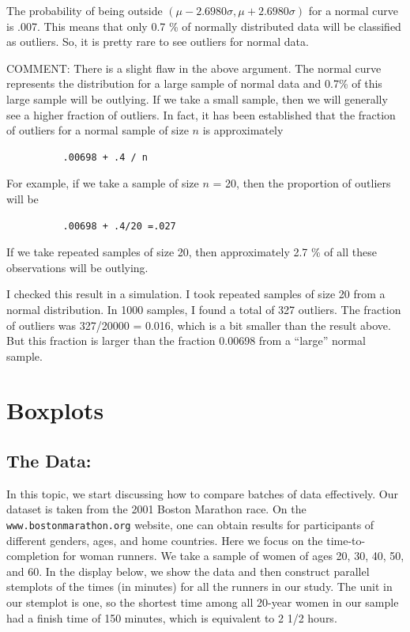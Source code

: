 \documentclass[
]{book}
\begin{document}
The probability of being outside \(( \mu - 2.6980\sigma , \mu + 2.6980 \sigma )\) for a normal curve is .007. This means that only 0.7 \% of normally distributed data will be classified as outliers. So, it is pretty rare to see outliers for normal data.

COMMENT: There is a slight flaw in the above argument. The normal curve represents the distribution for a large sample of normal data and 0.7\% of this large sample will be outlying. If we take a small sample, then we will generally see a higher fraction of outliers. In fact, it has been established that the fraction of outliers for a normal sample of size \(n\) is approximately

\begin{verbatim}
          .00698 + .4 / n
\end{verbatim}

For example, if we take a sample of size \(n\) = 20, then the proportion of outliers will be

\begin{verbatim}
          .00698 + .4/20 =.027
\end{verbatim}

If we take repeated samples of size 20, then approximately 2.7 \% of all these observations will be outlying.

I checked this result in a simulation. I took repeated samples of size 20 from a normal distribution. In 1000 samples, I found a total of 327 outliers. The fraction of outliers was 327/20000 = 0.016, which is a bit smaller than the result above. But this fraction is larger than the fraction 0.00698 from a ``large'' normal sample.

\hypertarget{boxplots}{%
\chapter{Boxplots}\label{boxplots}}

\hypertarget{the-data}{%
\section{The Data:}\label{the-data}}

In this topic, we start discussing how to compare batches of data effectively. Our dataset is taken from the 2001 Boston Marathon race. On the \texttt{www.bostonmarathon.org} website, one can obtain results for participants of different genders, ages, and home countries. Here we focus on the time-to-completion for woman runners. We take a sample of women of ages 20, 30, 40, 50, and 60. In the display below, we show the data and then construct parallel stemplots of the times (in minutes) for all the runners in our study. The unit in our stemplot is one, so the shortest time among all 20-year women in our sample had a finish time of 150 minutes, which is equivalent to 2 1/2 hours.
\end{document}
